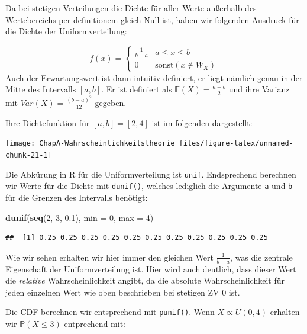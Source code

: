 \documentclass[]{book}
\newenvironment{Shaded}{\begin{snugshade}}{\end{snugshade}}
\newcommand{\KeywordTok}[1]{\textcolor[rgb]{0.13,0.29,0.53}{\textbf{#1}}}
\newcommand{\DataTypeTok}[1]{\textcolor[rgb]{0.13,0.29,0.53}{#1}}
\newcommand{\DecValTok}[1]{\textcolor[rgb]{0.00,0.00,0.81}{#1}}
\newcommand{\FloatTok}[1]{\textcolor[rgb]{0.00,0.00,0.81}{#1}}
\newcommand{\NormalTok}[1]{#1}
\begin{document}
Da bei stetigen Verteilungen die Dichte für aller Werte außerhalb des
Wertebereichs per definitionem gleich Null ist, haben wir folgenden
Ausdruck für die Dichte der Uniformverteilung:

\[f(x)=
\begin{cases} 
      \frac{1}{b-a} & a\leq x \leq b \\
      0 & \text{sonst} \left(x\notin W_X\right)
   \end{cases}
   \] Auch der Erwartungswert ist dann intuitiv definiert, er liegt
nämlich genau in der Mitte des Intervalls \([a,b]\). Er ist definiert
als \(\mathbb{E}(X)=\frac{a+b}{2}\) und ihre Varianz mit
\(Var(X)=\frac{(b-a)^2}{12}\) gegeben.

Ihre Dichtefunktion für \([a,b]=[2,4]\) ist im folgenden dargestellt:

\begin{center}\texttt{[image: ChapA-Wahrscheinlichkeitstheorie\_files/figure-latex/unnamed-chunk-21-1]} \end{center}

Die Abkürung in R für die Uniformverteilung ist \texttt{unif}.
Endsprechend berechnen wir Werte für die Dichte mit \texttt{dunif()},
welches lediglich die Argumente \texttt{a} und \texttt{b} für die
Grenzen des Intervalls benötigt:

\begin{Shaded}
\begin{Highlighting}[]
\KeywordTok{dunif}\NormalTok{(}\KeywordTok{seq}\NormalTok{(}\DecValTok{2}\NormalTok{, }\DecValTok{3}\NormalTok{, }\FloatTok{0.1}\NormalTok{), }\DataTypeTok{min =} \DecValTok{0}\NormalTok{, }\DataTypeTok{max =} \DecValTok{4}\NormalTok{)}
\end{Highlighting}
\end{Shaded}

\begin{verbatim}
##  [1] 0.25 0.25 0.25 0.25 0.25 0.25 0.25 0.25 0.25 0.25 0.25
\end{verbatim}

Wie wir sehen erhalten wir hier immer den gleichen Wert
\(\frac{1}{b-a}\), was die zentrale Eigenschaft der Uniformverteilung
ist. Hier wird auch deutlich, dass dieser Wert die \emph{relative}
Wahrscheinlichkeit angibt, da die absolute Wahrscheinlichkeit für jeden
einzelnen Wert wie oben beschrieben bei stetigen ZV 0 ist.

Die CDF berechnen wir entsprechend mit \texttt{punif()}. Wenn
\(X\propto U(0,4)\) erhalten wir \(\mathbb{P}(X\leq3)\) entprechend mit:
\end{document}
